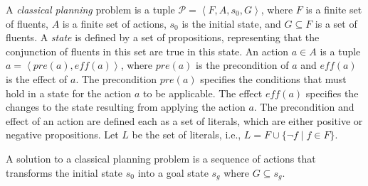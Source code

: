\documentclass[letterpaper]{article} %
\newcommand{\tuple}[1]{\ensuremath{\left \langle #1 \right \rangle }}
\newcommand{\commentout}[1]{ }
\newif\ifaddcomments
\newcommand{\roni}[1]{\ifaddcomments{\textcolor{red}{[Roni: #1]}}\fi}
\newcommand{\yarin}[1]{\ifaddcomments{\textcolor{teal}{[Yarin: #1]}}\fi}
\newcommand{\pascalJr}[1]{\ifaddcomments{\textcolor{cyan}{[Pascal L.: {#1}]}}\fi}
\begin{document}
A \emph{classical planning} problem is a tuple $\mathcal{P} = \tuple{F, A, s_0, G}$, where $F$ is a finite set of fluents, $A$ is a finite set of actions, $s_0$ is the initial state, and $G\subseteq F$ is a set of fluents. 
A \emph{state} is defined by a set of propositions, representing that the conjunction of fluents in this set are true in this state.
An action $a\in A$ is a tuple $a = \tuple{\mathit{pre}(a), \mathit{eff}(a)}$, where $\mathit{pre}(a)$ is the precondition of $a$ and $\mathit{eff}(a)$ is the effect of $a$. 
The precondition $\mathit{pre}(a)$ specifies the conditions that must hold in a state for the action $a$ to be applicable. The effect $\mathit{eff}(a)$ specifies the changes to the state resulting from applying the action $a$.   
The precondition and effect of an action are defined each as a set of literals, which are either positive or negative propositions. Let $L$ be the set of literals, i.e., 
$L = F \cup \{\neg f \mid f\in F\}$.
\roni{Commented out the lifted description for space considerations since We don't really use it in the paper}
\commentout{
Planning domains are usually represented in a \emph{lifted representation}, where the actions are defined with respect to a set of object types.
The lifted representation of a planning domain is defined as a tuple $\mathcal{D} = \tuple{O, P, A}$, where $O$ is a set of object types, $P$ is a set of predicates, and $A$ is a set of actions. Actions and predicates are parameterized by objects, and preconditions and effects are defined accordingly.
A \emph{grounded action} is obtained by replacing the parameters of an action with concrete objects in the current problem. 
}
A solution to a classical planning problem is a sequence of actions that transforms the initial state $s_0$ into a goal state $s_g$ where $G\subseteq s_g$. 
\end{document}
